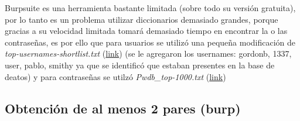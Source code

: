\documentclass[letter,12pt]{article}
\begin{document}
Burpsuite es una herramienta bastante limitada (sobre todo su versión gratuita), por lo tanto es un problema utilizar diccionarios demasiado grandes, porque gracias a su velocidad limitada tomará demasiado tiempo en encontrar la o las contraseñas, es por ello que para usuarios se utilizó una pequeña modificación de \textit{top-usernames-shortlist.txt} (\href{https://github.com/danielmiessler/SecLists/blob/master/Usernames/top-usernames-shortlist.txt}{link}) (se le agregaron los usernames: gordonb, 1337, user, pablo, smithy ya que se identificó que estaban presentes en la base de deatos) y para contraseñas se utilzó \textit{Pwdb\_top-1000.txt} (\href{https://github.com/danielmiessler/SecLists/blob/master/Passwords/Common-Credentials/Pwdb_top-1000.txt}{link})

\subsection{Obtención de al menos 2 pares (burp)}
\end{document}

